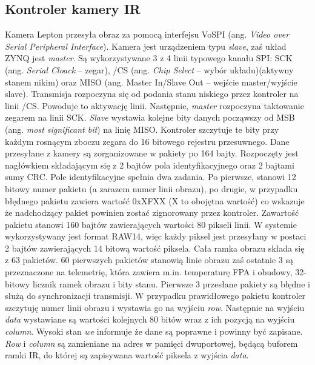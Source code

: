 \subsection{Kontroler kamery IR}
Kamera Lepton przesyła obraz za pomocą interfejsu VoSPI (ang. \textit{Video over Serial Peripheral Interface}). Kamera jest urządzeniem typu \textit{slave}, zaś układ ZYNQ jest \textit{master}. Są wykorzystywane 3 z 4 linii typowego kanału SPI: SCK (ang. \textit{Serial Cloack} – zegar), /CS (ang. \textit{Chip Select} -- wybór układu)(aktywny stanem nikim) oraz MISO (ang. {Master In/Slave Out} – wejście master/wyjście slave).
Transmisja rozpoczyna się od podania stanu niskiego przez kontroler na linii /CS. Powoduje to aktywację linii. Następnie, \textit{master} rozpoczyna taktowanie zegarem na linii SCK. \textit{Slave} wystawia kolejne bity danych począwszy od MSB (ang. \textit{most significant bit}) na linię MISO. Kontroler szczytuje te bity przy każdym rosnącym zboczu zegara do 16 bitowego rejestru przesuwnego.
Dane przesyłane z kamery są zorganizowane w pakiety po 164 bajty. Rozpoczęty jest nagłówkiem składającym się z 2 bajtów pola identyfikacyjnego oraz 2 bajtami sumy CRC. Pole identyfikacyjne spełnia dwa zadania. Po pierwsze, stanowi 12 bitowy numer pakietu (a zarazem numer linii obrazu), po drugie, w przypadku błędnego pakietu zawiera wartość 0xXFXX (X to obojętna wartość) co wskazuje że nadchodzący pakiet powinien zostać zignorowany przez kontroler. Zawartość pakietu stanowi 160 bajtów zawierających wartości 80 pikseli linii. W systemie wykorzystywany jest format RAW14, więc każdy piksel jest przesyłany w postaci 2 bajtów zawierających 14 bitową wartość piksela. 
Cała ramka obrazu składa się z 63 pakietów. 60 pierwszych pakietów stanowią linie obrazu zaś ostatnie 3 są przeznaczone na telemetrię, która zawiera m.in. temperaturę FPA i obudowy, 32-bitowy licznik ramek obrazu i bity stanu. 
Pierwsze 3 przesłane pakiety są błędne i służą do synchronizacji transmisji. 
W przypadku prawidłowego pakietu kontroler szczytuję numer linii obrazu i wystawia go na wyjściu \textit{row}. Następnie na wyjściu \textit{data} wystawiane są wartości kolejnych 80 bitów wraz z ich pozycją na wyjściu \textit{column}. Wysoki stan \textit{we} informuje że dane są poprawne i powinny być zapisane. 
\textit{Row} i \textit{column} są zamieniane na adres w pamięci dwuportowej, będącą buforem ramki IR, do której są zapisywana wartość piksela z wyjścia \textit{data}.

